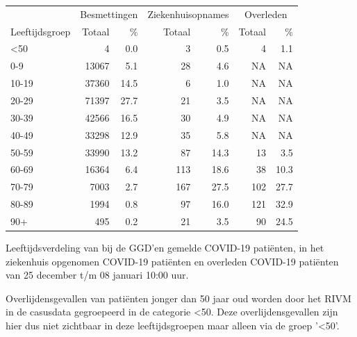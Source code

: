 \documentclass[
  english,
  man,floatsintext]{apa6}
\begin{document}
\begin{table}
\centering\begingroup\fontsize{11}{13}\selectfont

\begin{threeparttable}
\begin{tabular}{lrrrrrr}
\toprule
\multicolumn{1}{c}{ } & \multicolumn{2}{c}{Besmettingen} & \multicolumn{2}{c}{Ziekenhuisopnames} & \multicolumn{2}{c}{Overleden} \\
\cmidrule(l{3pt}r{3pt}){2-3} \cmidrule(l{3pt}r{3pt}){4-5} \cmidrule(l{3pt}r{3pt}){6-7}
Leeftijdsgroep & Totaal & \% & Totaal & \% & Totaal & \%\\
\midrule
<50 & 4 & 0.0 & 3 & 0.5 & 4 & 1.1\\
0-9 & 13067 & 5.1 & 28 & 4.6 & NA & NA\\
10-19 & 37360 & 14.5 & 6 & 1.0 & NA & NA\\
20-29 & 71397 & 27.7 & 21 & 3.5 & NA & NA\\
30-39 & 42566 & 16.5 & 30 & 4.9 & NA & NA\\
40-49 & 33298 & 12.9 & 35 & 5.8 & NA & NA\\
50-59 & 33990 & 13.2 & 87 & 14.3 & 13 & 3.5\\
60-69 & 16364 & 6.4 & 113 & 18.6 & 38 & 10.3\\
70-79 & 7003 & 2.7 & 167 & 27.5 & 102 & 27.7\\
80-89 & 1994 & 0.8 & 97 & 16.0 & 121 & 32.9\\
90+ & 495 & 0.2 & 21 & 3.5 & 90 & 24.5\\
\bottomrule
\end{tabular}
\begin{tablenotes}
\item[1] Leeftijdsverdeling van bij de GGD’en gemelde COVID-19 patiënten, in het ziekenhuis opgenomen COVID-19 patiënten en overleden COVID-19 patiënten van 25 december t/m 08 januari 10:00 uur.
\item[2] Overlijdensgevallen van patiënten jonger dan 50 jaar oud worden door het RIVM in de casusdata gegroepeerd in de categorie <50. Deze overlijdensgevallen zijn hier dus niet zichtbaar in deze leeftijdsgroepen maar alleen via de groep '<50'.
\end{tablenotes}
\end{threeparttable}
\endgroup{}
\end{table}

\newpage
\end{document}
